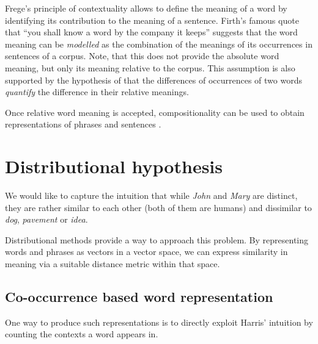 Frege's principle of contextuality allows to define the meaning of a word by identifying its contribution to the meaning of a sentence. Firth's \citeyearpar{firth1957lingtheory} famous quote that ``you shall know a word by the company it keeps''  suggests that the word meaning can be \emph{modelled} as the combination of the meanings of its occurrences in sentences of a corpus. Note, that this does not provide the absolute word meaning, but only its meaning relative to the corpus. This assumption is also supported by the hypothesis of  that the differences of occurrences of two words \emph{quantify} the difference in their relative meanings.

Once relative word meaning is accepted, compositionality can be used to obtain representations of phrases and sentences \cite{THEO:THEO373,Dowty1980,sep-montague-semantics,DBLP:journals/corr/abs-1003-4394,baroni2014frege}.

\section{Distributional hypothesis}
\label{sec:distr-hypoth}

We would like to capture the intuition that while \textit{John} and \textit{Mary} are distinct, they are rather similar to each other (both of them are humans) and dissimilar to \textit{dog}, \textit{pavement} or \textit{idea}.


Distributional methods provide a way to approach this problem. By representing words and phrases as vectors in a vector space, we can express similarity in meaning via a suitable distance metric within that space.

\subsection{Co-occurrence based word representation}
\label{sec:distr-repr}

One way to produce such representations is to directly exploit Harris' \citeyearpar{harris1954distributional} intuition by counting the contexts a word appears in.


